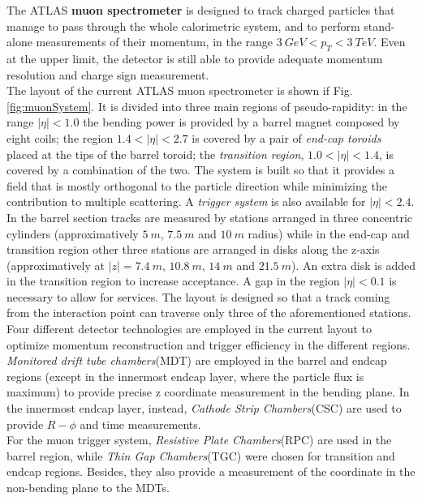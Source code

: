 \documentclass[a4paper,twoside,12pt]{article}
\begin{document}
The ATLAS \textbf{muon spectrometer} is designed to track charged particles that manage to pass through the whole calorimetric system, and to perform stand-alone measurements of their momentum, in the range 
$3\ GeV < p_{T} < 3\ TeV$. Even at the upper limit, the detector is still able to provide adequate momentum resolution and charge sign measurement.\\

The layout of the current  ATLAS muon spectrometer is shown if Fig. \ref{fig:muonSystem}. It is divided into three main regions of pseudo-rapidity: in the range $|\eta| < 1.0$ the bending power
is provided by a barrel magnet composed by eight coils; the region $1.4 < |\eta| < 2.7$ is covered by a pair of \textit{end-cap toroids} placed at the tips of the barrel toroid; the \textit{transition
region}, $1.0 < |\eta| < 1.4$, is covered by a combination of the two. The system is built so that it provides a field that is mostly orthogonal to the particle direction while minimizing the contribution to multiple scattering. A \textit{trigger system} is also available for $|\eta| < 2.4$. \\

In the barrel section tracks are measured by stations arranged in three concentric cylinders (approximatively $5\ m$, $7.5\ m$ and $10\ m$ radius) while in the end-cap and
transition region other three stations are arranged in disks along the z-axis (approximatively at  $|z| = 7.4\ m$, $10.8\ m$, $14\ m$ and $21.5\ m$). An extra disk is added in the transition
region to increase acceptance. A gap in the region $|\eta| < 0.1$ is necessary to allow for services. The layout is designed so that a track coming from the interaction point can traverse only three of the aforementioned stations.\\

Four different detector technologies are employed in the current layout to optimize momentum reconstruction and trigger efficiency in the 
different regions.  \textit{Monitored drift tube chambers}(MDT) are employed in the barrel and endcap regions (except in the innermost endcap layer, where the particle flux is maximum) to provide precise z coordinate measurement in the bending plane. In the innermost endcap layer, instead, \textit{Cathode Strip Chambers}(CSC) are used to provide $R-\phi$ and time measurements. \\

For the muon trigger system, \textit{Resistive Plate Chambers}(RPC) are used in the barrel region, while \textit{Thin Gap Chambers}(TGC) were chosen for transition and endcap regions. Besides, they also provide a measurement of the coordinate in the non-bending plane to the MDTs. 
\end{document}
